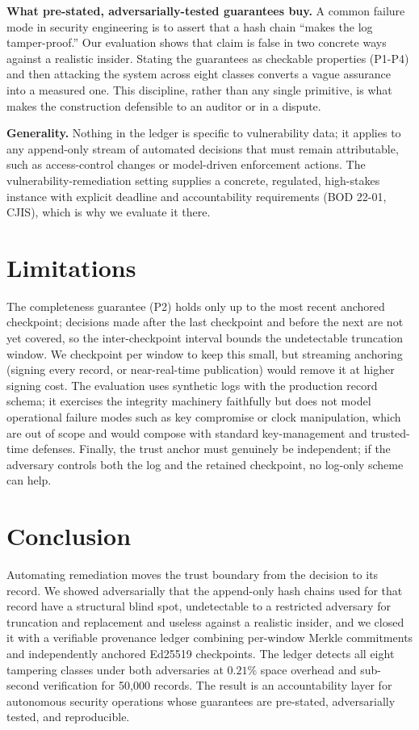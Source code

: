 \documentclass[journal]{IEEEtran}
\begin{document}
\textbf{What pre-stated, adversarially-tested guarantees buy.} A common
failure mode in security engineering is to assert that a hash chain ``makes
the log tamper-proof.'' Our evaluation shows that claim is false in two
concrete ways against a realistic insider. Stating the guarantees as
checkable properties (P1-P4) and then attacking the system across eight
classes converts a vague assurance into a measured one. This discipline,
rather than any single primitive, is what makes the construction defensible
to an auditor or in a dispute.

\textbf{Generality.} Nothing in the ledger is specific to vulnerability data;
it applies to any append-only stream of automated decisions that must remain
attributable, such as access-control changes or model-driven enforcement
actions. The vulnerability-remediation setting supplies a concrete,
regulated, high-stakes instance with explicit deadline and accountability
requirements (BOD 22-01, CJIS), which is why we evaluate it there.

\section{Limitations}
\label{sec:limitations}
The completeness guarantee (P2) holds only up to the most recent anchored
checkpoint; decisions made after the last checkpoint and before the next are
not yet covered, so the inter-checkpoint interval bounds the undetectable
truncation window. We checkpoint per window to keep this small, but
streaming anchoring (signing every record, or near-real-time publication)
would remove it at higher signing cost. The evaluation uses synthetic logs
with the production record schema; it exercises the integrity machinery
faithfully but does not model operational failure modes such as key
compromise or clock manipulation, which are out of scope and would compose
with standard key-management and trusted-time defenses. Finally, the trust
anchor must genuinely be independent; if the adversary controls both the log
and the retained checkpoint, no log-only scheme can help.

\section{Conclusion}
\label{sec:conclusion}
Automating remediation moves the trust boundary from the decision to its
record. We showed adversarially that the append-only hash chains used for
that record have a structural blind spot, undetectable to a restricted
adversary for truncation and replacement and useless against a realistic
insider, and we closed it with a verifiable provenance ledger combining
per-window Merkle commitments and independently anchored Ed25519 checkpoints.
The ledger detects all eight tampering classes under both adversaries at
$0.21\%$ space overhead and sub-second verification for 50{,}000 records.
The result is an accountability layer for autonomous security operations
whose guarantees are pre-stated, adversarially tested, and reproducible.
\end{document}

